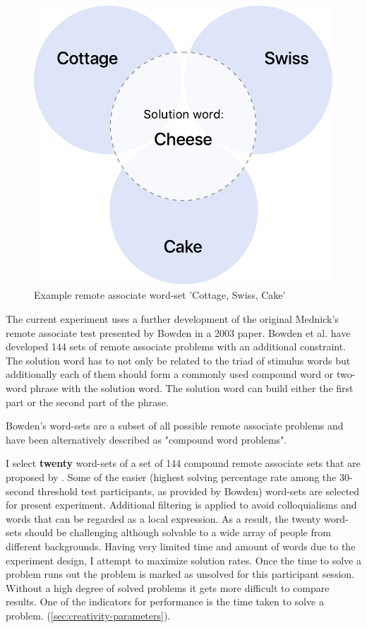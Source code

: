 		\begin{figure}[h]
			\centering
			\includegraphics[height=0.3\textheight]{graphics/Example-RAT-Set}
			\caption{Example remote associate word-set 'Cottage, Swiss, Cake'}
			\label{fig:exampleratset}
		\end{figure}

		The current experiment uses a further development of the original Mednick's remote associate test presented by Bowden in a 2003 paper. Bowden et al. \cite{Bowden} have developed 144 sets of remote associate problems with an additional constraint. The solution word has to not only be related to the triad of stimulus words but additionally each of them should form a commonly used compound word or two-word phrase with the solution word. The solution word can build either the first part or the second part of the phrase.
		
		Bowden's word-sets are a subset of all possible remote associate problems and have been alternatively described as "compound word problems".
		
 		I select \textbf{twenty} word-sets of a set of 144 compound remote associate sets that are proposed by \cite{Bowden}. Some of the easier (highest solving percentage rate among the 30-second threshold test participants, as provided by Bowden) word-sets are selected for present experiment. Additional filtering is applied to avoid colloquialisms and words that can be regarded as a local expression. As a result, the twenty word-sets should be challenging although solvable to a wide array of people from different backgrounds. Having very limited time and amount of words due to the experiment design, I attempt to maximize solution rates. Once the time to solve a problem runs out the problem is marked as unsolved for this participant session. Without a high degree of solved problems it gets more difficult to compare results.
		One of the indicators for performance is the time taken to solve a problem. (\ref{sec:creativity-parameters}).
 		
